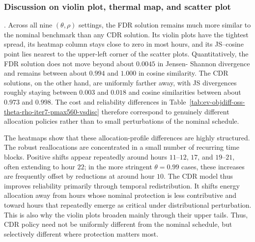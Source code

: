 \documentclass[opre,sglanonrev]{informs4}
\newcommand{\bx}{\bm{x}}
\begin{document}
{%

\subsubsection{Discussion on violin plot, thermal map, and scatter plot}. 
Across all nine \((\theta,\rho)\) settings, the FDR solution remains much more similar to the nominal benchmark than any CDR solution. Its violin plots have the tightest spread, its heatmap column stays close to zero in most hours, and its JS--cosine point lies nearest to the upper-left corner of the scatter plots. Quantitatively, the FDR solution does not move beyond about \(0.0045\) in Jensen- Shannon divergence and remains between about \(0.994\) and \(1.000\) in cosine similarity. The CDR solutions, on the other hand, are uniformly farther away, with JS divergences roughly staying between \(0.003\) and \(0.018\) and cosine similarities between about \(0.973\) and \(0.998\). The cost and reliability differences in Table~\ref{tab:ev-objdiff-oss-theta-rho-iter7-pmax560-vsdisc} therefore correspond to genuinely different allocation policies rather than to small perturbations of the nominal schedule.

The heatmaps show that these allocation-profile differences are highly structured. The robust reallocations are concentrated in a small number of recurring time blocks. Positive shifts appear repeatedly around hours \(11\)–\(12\), \(17\), and \(19\)–\(21\), often extending to hour \(22\); in the more stringent \(\theta=0.99\) cases, these increases are frequently offset by reductions at around hour \(10\). The CDR model thus improves reliability primarily through temporal redistribution. It shifts energy allocation away from hours whose nominal protection is less contributive and toward hours that repeatedly emerge as critical under distributional perturbation. This is also why the violin plots broaden mainly through their upper tails. Thus, CDR policy need not be uniformly different from the nominal schedule, but selectively different where protection matters most.

}
\end{document}
